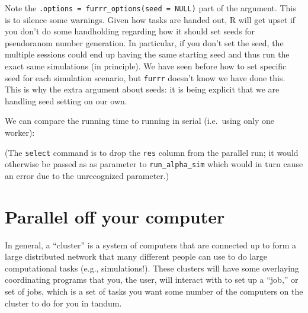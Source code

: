 \documentclass[
]{book}
\newenvironment{Shaded}{\begin{snugshade}}{\end{snugshade}}
\newcommand{\AttributeTok}[1]{\textcolor[rgb]{0.77,0.63,0.00}{#1}}
\newcommand{\FunctionTok}[1]{\textcolor[rgb]{0.00,0.00,0.00}{#1}}
\newcommand{\NormalTok}[1]{#1}
\newcommand{\OtherTok}[1]{\textcolor[rgb]{0.56,0.35,0.01}{#1}}
\newcommand{\SpecialCharTok}[1]{\textcolor[rgb]{0.00,0.00,0.00}{#1}}
\begin{document}
Note the \texttt{.options\ =\ furrr\_options(seed\ =\ NULL)} part of the argument.
This is to silence some warnings.
Given how tasks are handed out, R will get upset if you don't do some handholding regarding how it should set seeds for pseudoranom number generation.
In particular, if you don't set the seed, the multiple sessions could end up having the same starting seed and thus run the exact same simulations (in principle).
We have seen before how to set specific seed for each simulation scenario, but \texttt{furrr} doesn't know we have done this.
This is why the extra argument about seeds: it is being explicit that we are handling seed setting on our own.

We can compare the running time to running in serial (i.e.~using only one worker):

\begin{Shaded}
\end{Shaded}

(The \texttt{select} command is to drop the \texttt{res} column from the parallel run; it would otherwise be passed as as parameter to \texttt{run\_alpha\_sim} which would in turn cause an error due to the unrecognized parameter.)

\hypertarget{parallel-off-your-computer}{%
\section{Parallel off your computer}\label{parallel-off-your-computer}}

In general, a ``cluster'' is a system of computers that are connected up to form a large distributed network that many different people can use to do large computational tasks (e.g., simulations!).
These clusters will have some overlaying coordinating programs that you, the user, will interact with to set up a ``job,'' or set of jobs, which is a set of tasks you want some number of the computers on the cluster to do for you in tandum.
\end{document}

